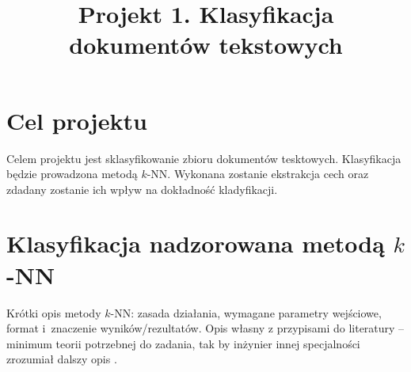 \documentclass{classrep}
\author{
  \studentinfo{Kamil Kiszko-Zgierski}{224328} \and
  \studentinfo{Hubert Gawłowski}{224298} }
\title{Projekt 1. Klasyfikacja dokumentów tekstowych}
\begin{document}
\maketitle

\section{Cel projektu}
Celem projektu jest sklasyfikowanie zbioru dokumentów tesktowych. Klasyfikacja będzie prowadzona  metodą $k$-NN. Wykonana zostanie ekstrakcja cech oraz zdadany zostanie ich wpływ na dokładność kladyfikacji.


\section{Klasyfikacja nadzorowana metodą $k$-NN}
Krótki opis metody $k$-NN: zasada działania, wymagane parametry wejściowe, format
i~znaczenie wyników/rezultatów. Opis własny z przypisami do literatury -- minimum
teorii potrzebnej do zadania, tak by inżynier innej specjalności zrozumiał dalszy
opis \cite{tadeusiewicz90}.\\
\end{document}
